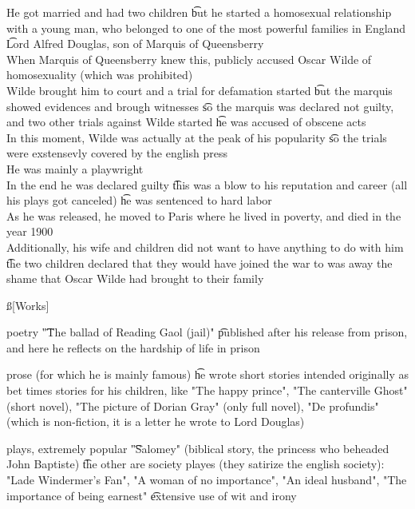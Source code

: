 \documentclass[12pt]{article}
\begin{document}
He got married and had two children \t but he started a homosexual relationship with a young man, who belonged to one of the most powerful families in England \t Lord Alfred Douglas, son of Marquis of Queensberry \\
When Marquis of Queensberry knew this, publicly accused Oscar Wilde of homosexuality (which was prohibited) \\
Wilde brought him to court and a trial for defamation started \t but the marquis showed evidences and brough witnesses \t so the marquis was declared not guilty, and two other trials against Wilde started \t he was accused of obscene acts \\
In this moment, Wilde was actually at the peak of his popularity \t so the trials were exstensevly covered by the english press \\
He was mainly a playwright \\
In the end he was declared guilty \t this was a blow to his reputation and career (all his plays got canceled) \t he was sentenced to hard labor \\
As he was released, he moved to Paris where he lived in poverty, and died in the year 1900 \\
Additionally, his wife and children did not want to have anything to do with him \t the two children declared that they would have joined the war to was away the shame that Oscar Wilde had brought to their family

\ss[Works]
\bi
\item poetry \t "The ballad of Reading Gaol (jail)" \t published after his release from prison, and here he reflects on the hardship of life in prison 
\item prose (for which he is mainly famous) \t he wrote short stories intended originally as bet times stories for his children, like "The happy prince", "The canterville Ghost" (short novel), "The picture of Dorian Gray" (only full novel), "De profundis" (which is non-fiction, it is a letter he wrote to Lord Douglas)
\item plays, extremely popular \t "Salomey" (biblical story, the princess who beheaded John Baptiste) \t the other are society playes (they satirize the english society): "Lade Windermer's Fan", "A woman of no importance", "An ideal husband", "The importance of being earnest" \t extensive use of wit and irony
\ei
\end{document}
